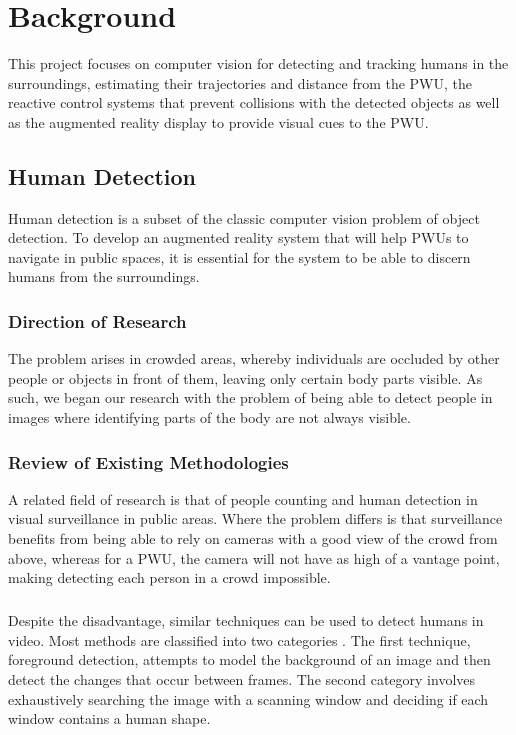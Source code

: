 \chapter{Background}
This project focuses on computer vision for detecting and tracking humans in the surroundings, estimating their trajectories and distance from the PWU, the reactive control systems that prevent collisions with the detected objects as well as the augmented reality display to provide visual cues to the PWU.

\section{Human Detection}
Human detection is a subset of the classic computer vision problem of object detection. To develop an augmented reality system that will help PWUs to navigate in public spaces, it is essential for the system to be able to discern humans from the surroundings.

\subsection{Direction of Research}
 The problem arises in crowded areas, whereby individuals are occluded by other people or objects in front of them, leaving only certain body parts visible. As such, we began our research with the problem of being able to detect people in images where identifying parts of the body are not always visible.

\subsection{Review of Existing Methodologies}
A related field of research is that of people counting and human detection in visual surveillance in public areas. Where the problem differs is that surveillance benefits from being able to rely on cameras with a good view of the crowd from above, whereas for a PWU, the camera will not have as high of a vantage point, making detecting each person in a crowd impossible. 

\paragraph{} Despite the disadvantage, similar techniques can be used to detect humans in video. Most methods are classified into two categories \cite{Hou2010}. The first technique, foreground detection, attempts to model the background of an image and then detect the changes that occur between frames. The second category involves exhaustively searching the image with a scanning window and deciding if each window contains a human shape.

